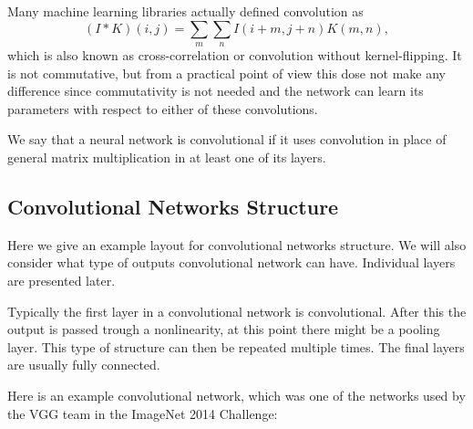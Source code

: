 \documentclass[]{article}
\begin{document}
Many machine learning libraries actually defined convolution as
\[
(I * K)(i, j) = \sum_m \sum_n I(i + m , j + n) K(m, n),
\]
which is also known as cross-correlation or convolution without kernel-flipping.
It is not commutative, but from a practical point of view this dose not make any difference
since commutativity is not needed and the network can learn its parameters with
respect to either of these convolutions.

We say that a neural network is convolutional if it uses convolution in place of
general matrix multiplication in at least one of its layers.

\subsection{Convolutional Networks Structure}
Here we give an example layout for convolutional networks structure. We will also
consider what type of outputs convolutional network can have. Individual layers are
presented later.

Typically the first layer in a convolutional network is convolutional. After this
the output is passed trough a nonlinearity, at this point there might be a pooling
layer. This type of structure can then be repeated multiple times. The final layers
are usually fully connected.

Here is an example convolutional network, which was one of the networks used by
the VGG team in the ImageNet 2014 Challenge:
\end{document}
